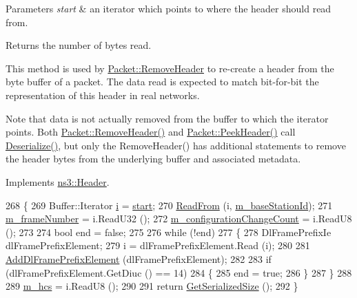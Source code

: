\begin{DoxyParams}{Parameters}
{\em start} & an iterator which points to where the header should read from. \\
\hline
\end{DoxyParams}
\begin{DoxyReturn}{Returns}
the number of bytes read.
\end{DoxyReturn}
This method is used by \hyperlink{classns3_1_1Packet_a0961eccf975d75f902d40956c93ba63e}{Packet\+::\+Remove\+Header} to re-\/create a header from the byte buffer of a packet. The data read is expected to match bit-\/for-\/bit the representation of this header in real networks.

Note that data is not actually removed from the buffer to which the iterator points. Both \hyperlink{classns3_1_1Packet_a0961eccf975d75f902d40956c93ba63e}{Packet\+::\+Remove\+Header()} and \hyperlink{classns3_1_1Packet_aadc63487bea70945c418f4c3e9b81964}{Packet\+::\+Peek\+Header()} call \hyperlink{classns3_1_1OfdmDownlinkFramePrefix_af73288c0b2ca162f5006cfc44b27e762}{Deserialize()}, but only the Remove\+Header() has additional statements to remove the header bytes from the underlying buffer and associated metadata. 

Implements \hyperlink{classns3_1_1Header_a78be9400bb66b2a8543606f395ef5396}{ns3\+::\+Header}.


\begin{DoxyCode}
268 \{
269   Buffer::Iterator \hyperlink{bernuolliDistribution_8m_a6f6ccfcf58b31cb6412107d9d5281426}{i} = \hyperlink{namespacevisualizer_1_1core_a2a35e5d8a34af358b508dac8635754e0}{start};
270   \hyperlink{namespacens3_aeeba9f1570f031f9e401f76f51943805}{ReadFrom} (i, \hyperlink{classns3_1_1OfdmDownlinkFramePrefix_a7b67a172f45eb5c21475fae2b1ccadc0}{m\_baseStationId});
271   \hyperlink{classns3_1_1OfdmDownlinkFramePrefix_a000a256bcb20f919dae6c434205f7c6d}{m\_frameNumber} = i.ReadU32 ();
272   \hyperlink{classns3_1_1OfdmDownlinkFramePrefix_a46c640590dd0d172932b724d951408e4}{m\_configurationChangeCount} = i.ReadU8 ();
273 
274   \textcolor{keywordtype}{bool} end = \textcolor{keyword}{false};
275 
276   \textcolor{keywordflow}{while} (!end)
277     \{
278       DlFramePrefixIe dlFramePrefixElement;
279       i = dlFramePrefixElement.Read (i);
280 
281       \hyperlink{classns3_1_1OfdmDownlinkFramePrefix_aa1d561299ef8d2a1e9754c6956e79764}{AddDlFramePrefixElement} (dlFramePrefixElement);
282 
283       \textcolor{keywordflow}{if} (dlFramePrefixElement.GetDiuc () == 14)
284         \{
285           end = \textcolor{keyword}{true};
286         \}
287     \}
288 
289   \hyperlink{classns3_1_1OfdmDownlinkFramePrefix_a886434776ca438227fbb61411b289f2a}{m\_hcs} = i.ReadU8 ();
290 
291   \textcolor{keywordflow}{return} \hyperlink{classns3_1_1OfdmDownlinkFramePrefix_abab3082b79a2000370268e9d60735aa1}{GetSerializedSize} ();
292 \}
\end{DoxyCode}


